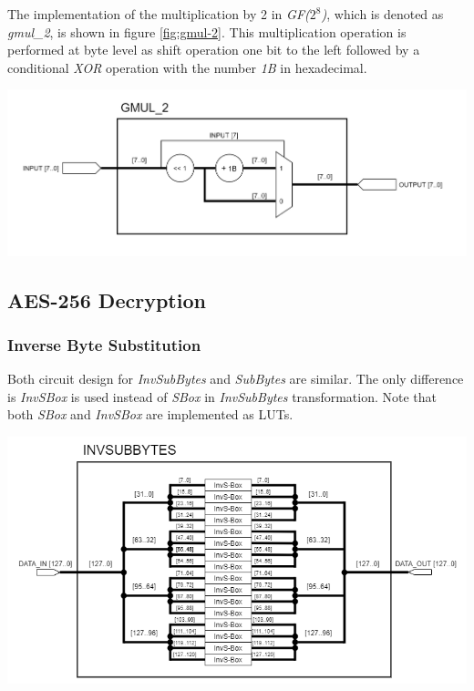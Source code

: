 \documentclass[a4paper, 10pt]{article}
\newenvironment{Figure}
    {\par\medskip\noindent\minipage{\linewidth}}
    {\endminipage\par\medskip}
\begin{document}
\begin{multicols}{2}
            The implementation of the multiplication by 2 in \textit{GF($2^{8}$)}, which is denoted as \textit{gmul\_2}, is shown in figure \ref{fig:gmul-2}. This multiplication operation is performed at byte level as shift operation one bit to the left followed by a conditional \textit{XOR} operation with the number \textit{1B} in hexadecimal.

            \noindent
            \begin{Figure}
                \centering
                \includegraphics[width=\linewidth]{gmul_2.png}
                \label{fig:gmul-2}
            \end{Figure}

            \subsection{AES-256 Decryption}

	

            \subsubsection{Inverse Byte Substitution}
        
	Both circuit design for \textit{InvSubBytes} and \textit{SubBytes} are similar. The only difference is \textit{InvSBox} is used instead of \textit{SBox} in \textit{InvSubBytes} transformation. Note that both \textit{SBox} and \textit{InvSBox} are implemented as LUTs.

	\noindent
            \begin{Figure}
                \centering
                \includegraphics[width=\linewidth]{InvSubBytes.png}
                \label{fig:invsubbytes}
            \end{Figure}


\end{multicols}
\end{document}
